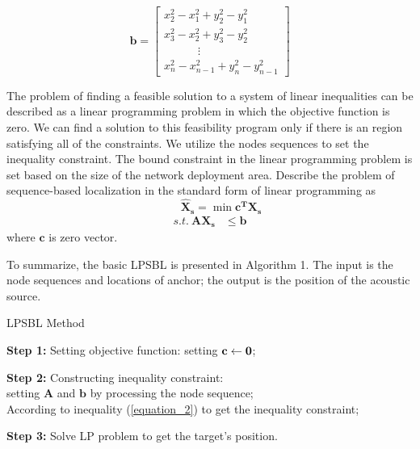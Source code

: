 \[\bm {b}=
\left[
\begin{array}{lcr}
x_2^2-x_1^2+y_2^2-y_1^2 \\
x_3^2-x_2^2+y_3^2-y_2^2 \\
  \quad \quad \quad  \vdots \\
x_n^2-x_{n-1}^2+y_n^2-y_{n-1}^2
\end{array}
\right]
\]


The problem of finding a feasible solution to a system of linear inequalities can be described as a linear programming problem in which the objective function is zero. 
We can find a solution to this feasibility program only if there is an region satisfying all of the constraints. 
We utilize the nodes sequences to set the inequality constraint.
The bound constraint in the linear programming problem is set based on the size of the network deployment area.
Describe the problem of sequence-based localization in the standard form of linear programming as
 \begin{equation} \label{6}
 \quad \quad \bm {\hat X_s} = \min {\bm{c^T}\bm{X_s}}
  \end{equation}
\begin{align*}
 s.t. \   \bm {{A}{X_s}} &\le \bm {b} 
\end{align*}
where $\bm {c}$ is zero vector.

To summarize, the basic LPSBL is presented in Algorithm 1. 
The input is the node sequences and locations of anchor; the output is the position of the acoustic source. 
\begin{algorithm}
\caption{LPSBL Method}

\textbf{Step 1:} Setting objective function: setting $\bf{c} \leftarrow \bf{0}$;

\textbf{Step 2:} Constructing inequality constraint: \\ 
\hspace{0.41in} setting $\bm{A}$ and $\bm{b}$ by processing the node sequence;\\
{
{
According to inequality (\ref{equation_2}) to get the inequality constraint;
}
}

\textbf{Step 3:} Solve LP problem to get the target's position.
\end{algorithm}

